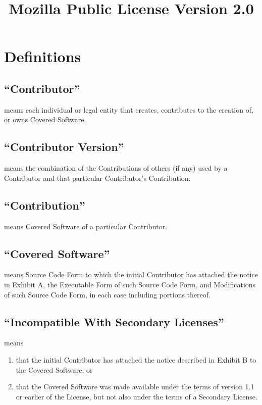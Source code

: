 \documentclass[a4paper, 12pt]{article}
\begin{document}
\title{Mozilla Public License Version 2.0}
\date{}

\maketitle

\section{Definitions}

\subsection{``Contributor''}
means each individual or legal entity that creates, contributes to the creation of, or owns Covered Software.

\subsection{``Contributor Version''}
means the combination of the Contributions of others (if any) used by a Contributor and that particular Contributor's Contribution.

\subsection{``Contribution''}
means Covered Software of a particular Contributor.

\subsection{``Covered Software''}
means Source Code Form to which the initial Contributor has attached the notice in Exhibit A, the Executable Form of such Source Code Form, and Modifications of such Source Code Form, in each case including portions thereof.

\subsection{``Incompatible With Secondary Licenses''}
means

\begin{enumerate}[label=(\alph*)]
\item that the initial Contributor has attached the notice described in Exhibit B to the Covered Software; or
\item that the Covered Software was made available under the terms of version 1.1 or earlier of the License, but not also under the terms of a Secondary License.
\end{enumerate}
\end{document}
